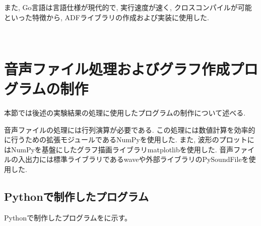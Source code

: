 また, Go言語は言語仕様が現代的で, 実行速度が速く, クロスコンパイルが可能といった特徴から, ADFライブラリの作成および実装に使用した. 



\
\section{音声ファイル処理およびグラフ作成プログラムの制作}\label{create-program}

本節では後述の実験結果の処理に使用したプログラムの制作について述べる. 

音声ファイルの処理には行列演算が必要である. この処理には数値計算を効率的に行うための拡張モジュールであるNumPyを使用した. また, 波形のプロットにはNumPyを基盤にしたグラフ描画ライブラリmatplotlibを使用した. 
音声ファイルの入出力には標準ライブラリであるwaveや外部ライブラリのPySoundFileを使用した. 


\subsection{Pythonで制作したプログラム}\label{python}

Pythonで制作したプログラムをに示す。

